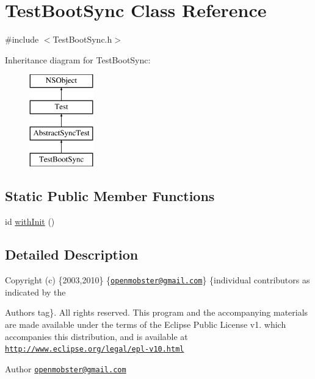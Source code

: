 \hypertarget{interface_test_boot_sync}{
\section{\-Test\-Boot\-Sync \-Class \-Reference}
\label{interface_test_boot_sync}
}


{\ttfamily \#include $<$\-Test\-Boot\-Sync.\-h$>$}

\-Inheritance diagram for \-Test\-Boot\-Sync\-:\begin{figure}[H]
\begin{center}
\leavevmode
\includegraphics[height=4.000000cm]{interface_test_boot_sync}
\end{center}
\end{figure}
\subsection*{\-Static \-Public \-Member \-Functions}
\begin{DoxyCompactItemize}
\item 
id \hyperlink{interface_test_boot_sync_a3db9d9d191768fb60a62c74a48569904}{with\-Init} ()
\end{DoxyCompactItemize}


\subsection{\-Detailed \-Description}
\-Copyright (c) \{2003,2010\} \{\href{mailto:openmobster@gmail.com}{\tt openmobster@gmail.\-com}\} \{individual contributors as indicated by the \begin{DoxyAuthor}{\-Authors}
tag\}. \-All rights reserved. \-This program and the accompanying materials are made available under the terms of the \-Eclipse \-Public \-License v1. which accompanies this distribution, and is available at \href{http://www.eclipse.org/legal/epl-v10.html}{\tt http\-://www.\-eclipse.\-org/legal/epl-\/v10.\-html}
\end{DoxyAuthor}
\begin{DoxyAuthor}{\-Author}
\href{mailto:openmobster@gmail.com}{\tt openmobster@gmail.\-com} 
\end{DoxyAuthor}


